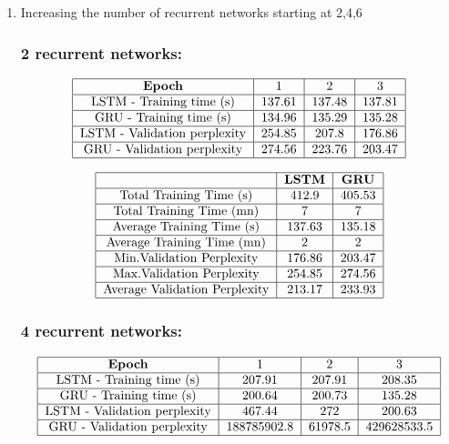 \documentclass[11pt]{article}
\newcommand{\0}{\mat{0}}
\begin{document}
\begin{itemize}
\begin{enumerate}
	\item Increasing the number of recurrent networks starting at 2,4,6
	\subsubsection*{\textbf{2 recurrent networks:}}
	  \[
  	 	\begin{tabular}{| c | c | c | c |}
  	 	 	\hline
	 	 		\textbf{Epoch} & 1 & 2 & 3  \\
	  	 	\hline
	 			LSTM - Training time (s)		& 137.61 & 137.48 & 137.81 \\
	 	 	\hline
				GRU - Training time (s)		& 134.96& 135.29 & 135.28 \\
			\hline 
				LSTM - Validation perplexity	& 254.85 & 207.8 & 176.86 \\
			\hline 
				GRU - Validation perplexity	& 274.56 & 223.76 & 203.47 \\
			\hline
		\end{tabular}
	\] 

	  \[
  	 	\begin{tabular}{| c | c | c |}
  	 	 	\hline
	 	 		& \textbf{LSTM} &  \textbf{GRU} \\
	  	 	\hline
	 			Total Training Time (s)		& 412.9 & 405.53 \\
	 	 	\hline
				Total Training Time (mn)		& 7 & 7 \\
			\hline 
				Average Training Time (s)	 	& 137.63 & 135.18 \\
			\hline 
				Average Training Time (mn)	& 2 & 2 \\
			\hline
				Min.Validation Perplexity		& 176.86 & 203.47 \\
			\hline
				Max.Validation Perplexity		& 254.85 & 274.56 \\
			\hline
				Average Validation Perplexity	& 213.17 & 233.93 \\
			\hline
		\end{tabular}
	\] 
	
	\subsubsection*{\textbf{4 recurrent networks:}}
	  \[
  	 	\begin{tabular}{| c | c | c | c |}
  	 	 	\hline
	 	 		\textbf{Epoch} & 1 & 2 & 3  \\
	  	 	\hline
	 			LSTM - Training time (s)		& 207.91 & 207.91 & 208.35 \\
	 	 	\hline
				GRU - Training time (s)		& 200.64 & 200.73 & 135.28 \\
			\hline 
				LSTM - Validation perplexity	& 467.44 & 272 & 200.63 \\
			\hline 
				GRU - Validation perplexity	& 188785902.8 & 61978.5	 & 429628533.5 \\
			\hline
		\end{tabular}
	\] 


\end{enumerate}
\end{itemize}
\end{document}
